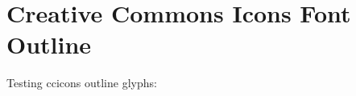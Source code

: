 \documentclass{article}
\begin{document}
\section{Creative Commons Icons Font Outline}

Testing ccicons outline glyphs:
\ccLogo \quad \ccAttribution \quad \ccShareAlike \quad \ccby
\end{document}
